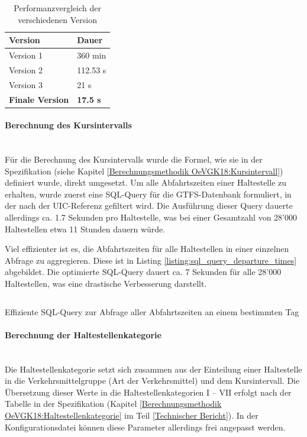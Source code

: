 \begin{table}[ht]
    \centering
    \begin{tabular}[ht]{l l}
        \toprule
        \textbf{Version} 
                                & \textbf{Dauer}\\
        \midrule
        Version 1
                                & 360 min\\
        Version 2
                                & 112.53 s\\
        Version 3
                                & 21 s\\
        \textbf{Finale Version}
                                & \textbf{17.5 s}\\            
        \bottomrule
    \end{tabular}
    \caption{Performanzvergleich der verschiedenen Version}
    \label{table:Performanzvergleich der verschiedenen Version}
\end{table}

\paragraph{Berechnung des Kursintervalls}~\\
Für die Berechnung des Kursintervalls wurde die Formel, wie sie in der Spezifikation (siehe Kapitel \ref{Berechnungsmethodik OeVGK18:Kursintervall}) definiert wurde, direkt umgesetzt.
Um alle Abfahrtszeiten einer Haltestelle zu erhalten, wurde zuerst eine SQL-Query für die GTFS-Datenbank formuliert, in der nach der \acs{UIC}-Referenz gefiltert wird.
Die Ausführung dieser Query dauerte allerdings ca. 1.7 Sekunden pro Haltestelle, was bei einer Gesamtzahl von 28'000 Haltestellen etwa 11 Stunden dauern würde.

Viel effizienter ist es, die Abfahrtszeiten für alle Haltestellen in einer einzelnen Abfrage zu aggregieren.
Diese ist in Listing \ref{listing:sql_query_departure_times} abgebildet.
Die optimierte SQL-Query dauert ca. 7 Sekunden für alle 28'000 Haltestellen, was eine drastische Verbesserung darstellt.

\begin{listing}[ht]
    \inputminted{sql}{projectdoc/listing/departure_time_cte.sql}
    \caption{Effiziente SQL-Query zur Abfrage aller Abfahrtszeiten an einem bestimmten Tag}
    \label{listing:sql_query_departure_times}
\end{listing}

\paragraph{Berechnung der Haltestellenkategorie}~\\
Die Haltestellenkategorie setzt sich zusammen aus der Einteilung einer Haltestelle in die Verkehrsmittelgruppe (Art der Verkehrsmittel) und dem Kursintervall.
Die Übersetzung dieser Werte in die Haltestellenkategorien  I -- VII erfolgt nach der Tabelle in der Spezifikation (Kapitel \ref{Berechnungsmethodik OeVGK18:Haltestellenkategorie} im Teil \ref{Technischer Bericht}).
In der Konfigurationsdatei können diese Parameter allerdings frei angepasst werden.

